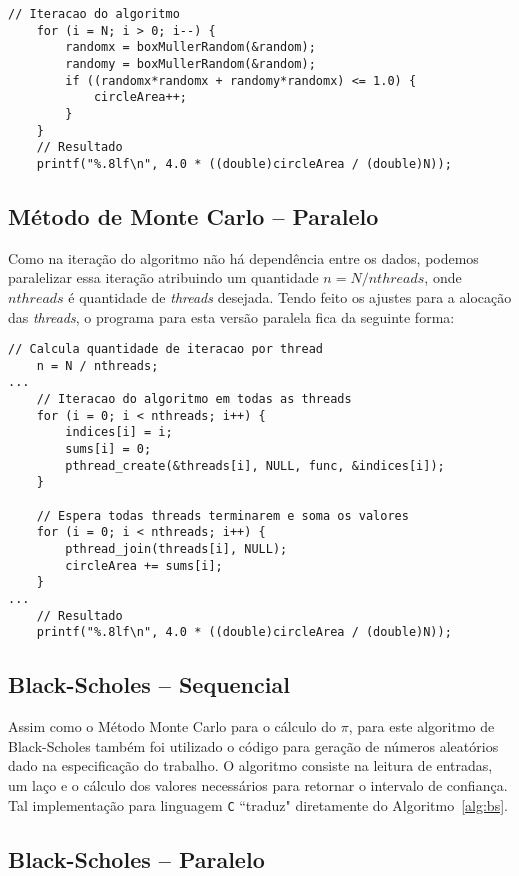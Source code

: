 \begin{lstlisting}[caption={Método Monte Carlo para $\pi$ -- Sequencial: trecho de código},label={lst:mc-1}]
	// Iteracao do algoritmo
	for (i = N; i > 0; i--) {
		randomx = boxMullerRandom(&random);
		randomy = boxMullerRandom(&random);
		if ((randomx*randomx + randomy*randomx) <= 1.0) {
			circleArea++;
		}
	}
	// Resultado
	printf("%.8lf\n", 4.0 * ((double)circleArea / (double)N));
\end{lstlisting}


\subsection{Método de Monte Carlo -- Paralelo}

Como na iteração do algoritmo não há dependência entre os dados, podemos paralelizar essa iteração atribuindo um quantidade $n = N / nthreads$, onde $nthreads$ é quantidade de \textit{threads} desejada. Tendo feito os ajustes para a alocação das \textit{threads}, o programa para esta versão paralela fica da seguinte forma:

\begin{lstlisting}[caption={Método Monte Carlo para $\pi$ -- Paralelo: trecho de código},label={lst:mc-2}]
	// Calcula quantidade de iteracao por thread
	n = N / nthreads;
...
	// Iteracao do algoritmo em todas as threads
	for (i = 0; i < nthreads; i++) {
		indices[i] = i;
		sums[i] = 0;
		pthread_create(&threads[i], NULL, func, &indices[i]);
	}

	// Espera todas threads terminarem e soma os valores
	for (i = 0; i < nthreads; i++) {
		pthread_join(threads[i], NULL);
		circleArea += sums[i];
	}
...
	// Resultado
	printf("%.8lf\n", 4.0 * ((double)circleArea / (double)N));
\end{lstlisting}

\subsection{Black-Scholes -- Sequencial}

Assim como o Método Monte Carlo para o cálculo do $\pi$, para este algoritmo de Black-Scholes também foi utilizado o código para geração de números aleatórios dado na especificação do trabalho. O algoritmo consiste na leitura de entradas, um laço e o cálculo dos valores necessários para retornar o intervalo de confiança. Tal implementação para linguagem \texttt{C} ``traduz" diretamente do Algoritmo~\ref{alg:bs}.

\subsection{Black-Scholes -- Paralelo}

